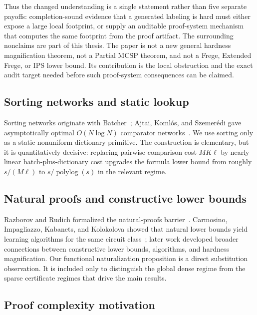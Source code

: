 \documentclass[11pt]{article}
\theoremstyle{definition}
\newcommand{\polylog}{\operatorname{polylog}}
\begin{document}
Thus the changed understanding is a single statement rather than five separate
payoffs: completion-sound evidence that a generated labeling is hard must either
expose a large local footprint, or supply an auditable proof-system mechanism
that computes the same footprint from the proof artifact.  The surrounding
nonclaims are part of this thesis.  The paper is not a new general hardness
magnification theorem, not a Partial MCSP theorem, and not a Frege, Extended
Frege, or IPS lower bound.  Its contribution is the local obstruction and the
exact audit target needed before such proof-system consequences can be claimed.

\subsection{Sorting networks and static lookup}

Sorting networks originate with Batcher~\cite{Batcher68}; Ajtai, Koml\'os, and Szemer\'edi gave asymptotically optimal $O(N\log N)$ comparator networks~\cite{AKS83}.  We use sorting only as a static nonuniform dictionary primitive.  The construction is elementary, but it is quantitatively decisive: replacing pairwise comparison cost $MK\ell$ by nearly linear batch-plus-dictionary cost upgrades the formula lower bound from roughly $s/(M\ell)$ to $s/\polylog(s)$ in the relevant regime.

\subsection{Natural proofs and constructive lower bounds}

Razborov and Rudich formalized the natural-proofs barrier~\cite{RR97}.  Carmosino, Impagliazzo, Kabanets, and Kolokolova showed that natural lower bounds yield learning algorithms for the same circuit class~\cite{CIKK16}; later work developed broader connections between constructive lower bounds, algorithms, and hardness magnification.  Our functional naturalization proposition is a direct substitution observation.  It is included only to distinguish the global dense regime from the sparse certificate regimes that drive the main results.

\subsection{Proof complexity motivation}
\end{document}
